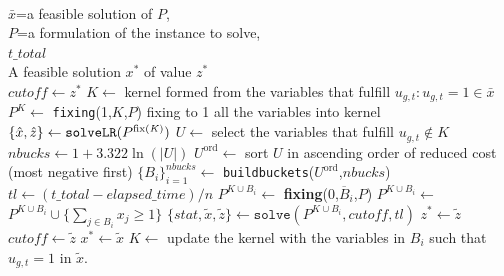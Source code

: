 \begin{algorithm}[htb]
\small
\caption{\texttt{kernelsearch()}}
\label{alg:KS}
\begin{algorithmic}
\Require \\
$\bar{x}$=a feasible solution of $P$, \\
$P$=a formulation of the instance to solve,\\
$\textit{t\_total}$
\Ensure \\
A feasible solution $x^{*}$ of value $z^{*}$ \\

    \State $\textit{cutoff} \leftarrow z^{*}$ 
    \State $K \leftarrow$ kernel formed from the variables that fulfill $u_{g,t}:u_{g,t}=1\in\bar{x}$ 
    \State $ P^{ K}\leftarrow$ \texttt{fixing}(1,$K$,$P$) fixing to 1 all the variables into kernel
    \State $\lbrace \hat{x}, \hat{z} \rbrace \leftarrow \texttt{solveLR}( P^{\text{fix(\textit{K})}})$ 
    \State $U \leftarrow$ select the variables that fulfill ${u}_{g,t}\notin K$
    \State $\textit{nbucks} \leftarrow 1 + 3.322 \ln(|\textit{U}|)$
    \State $U^{\text{ord}} \leftarrow$ sort $U$ in ascending order of reduced cost (most negative first) 
    \State $\{ B_i\}_{i=1}^{\textit{nbucks}} \leftarrow$ \texttt{buildbuckets}($U^{\text{ord}}$,$\textit{nbucks}$)  
    \State $tl \leftarrow (\textit{t\_total}-\textit{elapsed\_time}) / n$ 
     
            \State $ P^{ K\cup B_i}\leftarrow$ \textbf{fixing}(0,$\overline{B}_i$,$P$) 
            \State $ P^{ K\cup B_i}\leftarrow$ $ P^{ K\cup B_i} \cup \lbrace \sum_{j\in B_{i}}x_{j} \geq 1\rbrace $ 
            \State $\lbrace stat, \widetilde{x}, \widetilde{z} \rbrace \leftarrow \texttt{solve}( P^{ K\cup B_i}, \textit{cutoff},tl)$
                        \State $z^{*} \leftarrow \widetilde{z}$ 
                        \State $\textit{cutoff} \leftarrow \widetilde{z}$ 
                        \State $x^* \leftarrow \widetilde{x}$ 
                \EndIf
                \State $K \leftarrow$ update the kernel with the variables in $B_i$ such that $u_{g,t} = 1$ in $\widetilde{x}$.
            \EndIf
    \EndFor
\EndWhile\\
\end{algorithmic}
\end{algorithm}          
